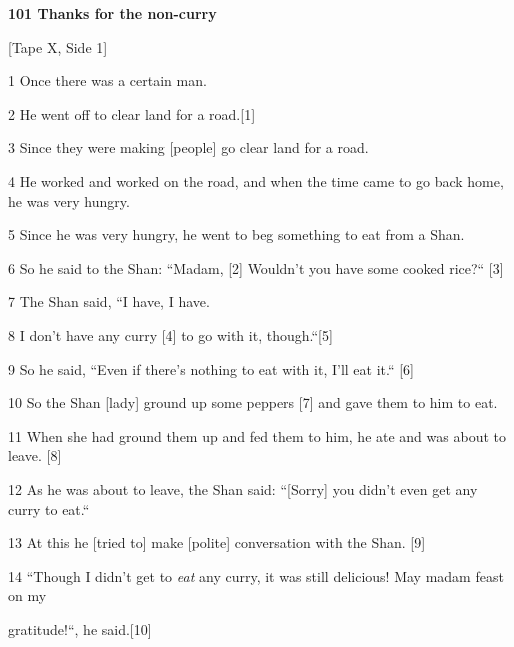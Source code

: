 
{\Large{}\textbf{101 Thanks for the non-curry }}

{\Large{}[Tape X, Side 1]}

{\Large{}1 Once there was a certain man.}

{\Large{}2 He went off to clear land for a road.[1]}

{\Large{}3 Since they were making [people] go clear land for a road.}

{\Large{}4 He worked and worked on the road, and when the time came to go back
home, he was very hungry.}

{\Large{}5 Since he was very hungry, he went to beg something to eat from a Shan.}

{\Large{}6 So he said to the Shan: ``Madam, [2] Wouldn't you have some
cooked rice?`` [3]}

{\Large{}7 The Shan said, ``I have, I have. }

{\Large{}8 I don't have any curry [4] to go with it, though.``[5]}

{\Large{}9 So he said, ``Even if there's nothing to eat with it, I'll eat
it.`` [6]}

{\Large{}10 So the Shan [lady] ground up some peppers [7] and gave them to him
to eat.}

{\Large{}11 When she had ground them up and fed them to him, he ate and was about
to leave. [8]}

{\Large{}12 As he was about to leave, the Shan said: ``[Sorry] you didn't
even get any curry to eat.`` }

{\Large{}13 At this he [tried to] make [polite] conversation with the Shan. [9]}

{\Large{}14 ``Though I didn't get to }{\Large{}\textit{eat}}{\Large{} any
curry, it was still delicious! May madam feast on my      }

{\Large{}gratitude!``, he said.[10] }

